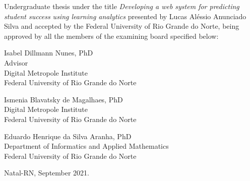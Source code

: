\begin{folhadeaprovacao}
	\setlength{\ABNTsignthickness}{0.4pt}
	\setlength{\ABNTsignwidth}{10cm}
	
	\noindent 
    Undergraduate thesis under the title {\it Developing a web system for predicting student success using learning analytics} presented by Lucas Aléssio Anunciado Silva and accepted by the Federal University of Rio Grande do Norte, being approved by all the members of the examining board specified below:
		
	\assinatura
	{
		Isabel Dillmann Nunes, PhD\\
		{\small Advisor} 															\\ 
		{\footnotesize
			Digital Metropole Institute																\\
		  	Federal University of Rio Grande do Norte
		}
	}
	
	\assinatura
	{
		Ismenia Blavatsky de Magalhaes, PhD\\
		{\footnotesize
			Digital Metropole Institute													\\
		  	Federal University of Rio Grande do Norte
		}
	}
	
	\assinatura
	{
		Eduardo Henrique da Silva Aranha, PhD\\
		{\footnotesize
			Department of Informatics and Applied Mathematics																\\
		  	Federal University of Rio Grande do Norte
		}
	}
	
		
	\vfill
	
	\begin{center}
		Natal-RN, September 2021.
	\end{center}
\end{folhadeaprovacao}